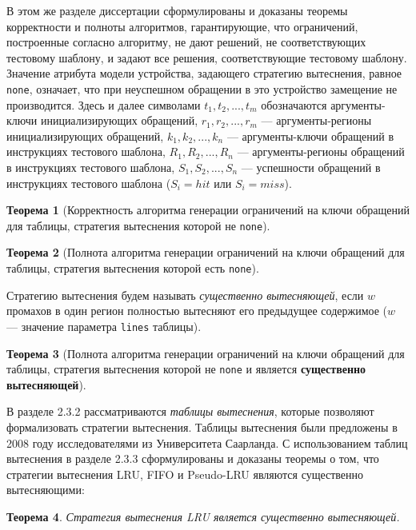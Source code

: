 \documentclass[14pt,autoref,href
,facsimile
]{disser}
\newtheorem{theorem}{Теорема}
\begin{document}
В этом же разделе диссертации сформулированы и доказаны теоремы корректности и полноты алгоритмов, гарантирующие, что ограничений, построенные согласно алгоритму, не дают решений, не соответствующих тестовому шаблону, и задают все решения, соответствующие тестовому шаблону. Значение атрибута модели устройства, задающего стратегию вытеснения, равное \texttt{none}, означает, что при неуспешном обращении в это устройство замещение не производится. Здесь и далее символами $t_1, t_2, ..., t_m$ обозначаются аргументы-ключи инициализирующих обращений, $r_1, r_2, ..., r_m$ --- аргументы-регионы инициализирующих обращений, $k_1, k_2, ..., k_n$ --- аргументы-ключи обращений в инструкциях тестового шаблона, $R_1, R_2, ..., R_n$ --- аргументы-регионы обращений в инструкциях тестового шаблона, $S_1, S_2, ..., S_n$ --- успешности обращений в инструкциях тестового шаблона ($S_i = hit$ или $S_i = miss$).

\begin{theorem}[Корректность алгоритма генерации ограничений на ключи обращений для таблицы, стратегия вытеснения которой не \texttt{none}]\label{mirror_correctness}
\CorrectnessMirror
\end{theorem}

\begin{theorem}[Полнота алгоритма генерации ограничений на ключи обращений для таблицы, стратегия вытеснения которой есть \texttt{none}]\label{mirror_fullness_none}
\FullnessMirrorNone
\end{theorem}

Стратегию вытеснения будем называть \emph{существенно вытесняющей}, если $w$ промахов в один регион полностью вытесняют его предыдущее содержимое ($w$ --- значение параметра \texttt{lines} таблицы).

\begin{theorem}[Полнота алгоритма генерации ограничений на ключи обращений для таблицы, стратегия вытеснения которой не \texttt{none} и является \textbf{существенно вытесняющей}]\label{mirror_fullness}
\FullnessMirror
\end{theorem}

В разделе 2.3.2 рассматриваются \emph{таблицы вытеснения}, которые позволяют формализовать стратегии вытеснения. Таблицы вытеснения были предложены в 2008 году исследователями из Университета Саарланда. С использованием таблиц вытеснения в разделе 2.3.3 сформулированы и доказаны теоремы о том, что стратегии вытеснения LRU, FIFO и Pseudo-LRU являются существенно вытесняющими:
\begin{theorem}\label{thm:LRU_essential}
Стратегия вытеснения LRU является существенно вытесняющей.
\end{theorem}
\end{document}
